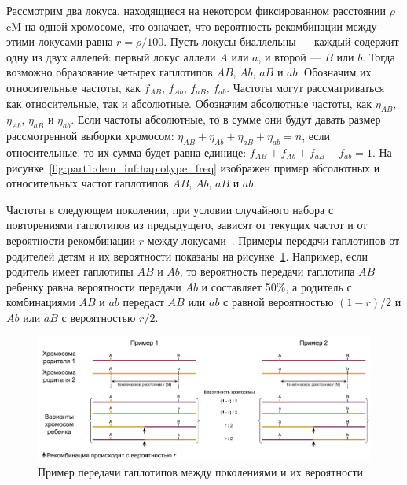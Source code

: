Рассмотрим два локуса, находящиеся на некотором фиксированном расстоянии $\rho$ cM на одной хромосоме, что означает, что вероятность рекомбинации между этими локусами равна $r = \rho / 100$.
Пусть локусы биаллельны --- каждый содержит одну из двух аллелей: первый локус аллели $A$ или $a$, и второй --- $B$ или $b$.
Тогда возможно образование четырех гаплотипов $AB$, $Ab$, $aB$ и $ab$.
Обозначим их относительные частоты, как $f_{AB}$, $f_{Ab}$, $f_{aB}$, $f_{ab}$.
Частоты могут рассматриваться как относительные, так и абсолютные.
Обозначим абсолютные частоты, как  $\eta_{AB}$, $\eta_{Ab}$, $\eta_{aB}$ и $\eta_{ab}$.
Если частоты абсолютные, то в сумме они будут давать размер рассмотренной выборки хромосом: $\eta_{AB} + \eta_{Ab} + \eta_{aB} + \eta_{ab} = n$, если относительные, то их сумма будет равна единице: $f_{AB} + f_{Ab} + f_{aB} + f_{ab} = 1$.
На рисунке~\ref{fig:part1:dem_inf:haplotype_freq} изображен пример абсолютных и относительных частот гаплотипов $AB$, $Ab$, $aB$ и $ab$.

Частоты в следующем поколении, при условии случайного набора с повторениями гаплотипов из предыдущего, зависят от текущих частот и от вероятности рекомбинации $r$ между локусами~\cite{watterson1970effect}.
Примеры передачи гаплотипов от родителей детям и их вероятности показаны на рисунке~\ref{fig:part1:dem_inf:haplotype_inher}.
Например, если родитель имеет гаплотипы $AB$ и $Ab$, то вероятность передачи гаплотипа $AB$ ребенку равна вероятности передачи $Ab$ и составляет 50\%, а родитель с комбинациями $AB$ и $ab$ передаст $AB$ или $ab$ с равной вероятностью $(1−r)/2$ и $Ab$ или $aB$ с вероятностью $r/2$.

\begin{figure}[t]
    \centering
    \includegraphics[width=\textwidth]{images/part1/data/haplotype_to_child.pdf}
    \caption{Пример передачи гаплотипов между поколениями и их вероятности}
    \label{fig:part1:dem_inf:haplotype_inher}
\end{figure}

